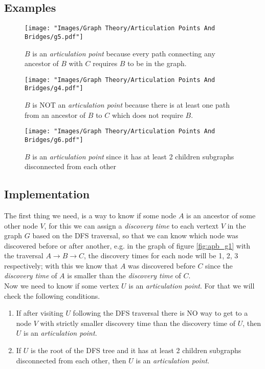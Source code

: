 \subsection*{Examples}

\begin{figure}[H]
  \centering
  \texttt{[image: "Images/Graph Theory/Articulation Points And Bridges/g5.pdf"]}
  \caption{$B$ is an \textit{articulation point} because every path connecting any ancestor of $B$ with $C$
    requires $B$ to be in the graph.}
  \label{fig:apb_g5}
\end{figure}

\begin{figure}[H]
  \centering
  \texttt{[image: "Images/Graph Theory/Articulation Points And Bridges/g4.pdf"]}
  \caption{$B$ is NOT an \textit{articulation point} because there is at least one path from an ancestor of $B$ to $C$
    which does not require $B$.}
  \label{fig:apb_g4}
\end{figure}

\begin{figure}[H]
  \centering
  \texttt{[image: "Images/Graph Theory/Articulation Points And Bridges/g6.pdf"]}
  \caption{$B$ is an \textit{articulation point} since it has at least 2 children subgraphs disconnected from each other}
  \label{fig:apb_g6}
\end{figure}

\subsection*{Implementation}

The first thing we need, is a way to know if some node $A$ is an ancestor of some other node $V$, for this
we can assign a \textit{discovery time} to each vertext $V$ in the graph $G$ based on the DFS traversal,
so that we can know which node was discovered before or after another, e.g. in the graph of figure \ref{fig:apb_g1} with the traversal
$A \rightarrow B \rightarrow C$, the discovery times for each node will be 1, 2, 3 respectively; with this we know that
$A$ was discovered before $C$ since the \textit{discovery time} of $A$ is smaller than the \textit{discovery time} of $C$.\\

\noindent
Now we need to know if some vertex $U$ is an \textit{articulation point}. For that we will check the following conditions.

\begin{enumerate}
  \item If after visiting $U$ following the DFS traversal there is NO way to get to a node $V$ with strictly smaller discovery time
        than the discovery time of $U$, then $U$ is an \textit{articulation point}.
  \item If $U$ is the root of the DFS tree and it has at least 2 children subgraphs disconnected from each other, then $U$ is an
        \textit{articulation point}.
\end{enumerate}